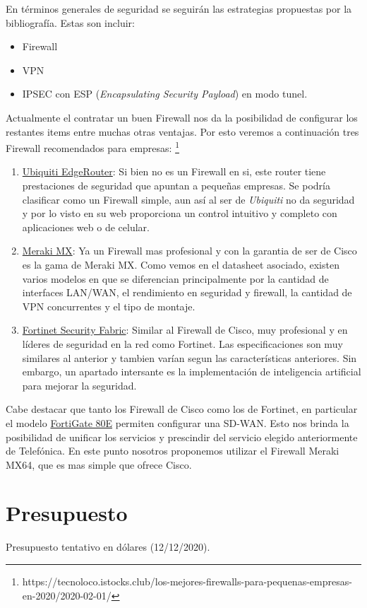 \documentclass[11pt]{article}
\begin{document}
    En términos generales de seguridad se seguirán las estrategias propuestas por la bibliografía. Estas son incluir:
    \begin{itemize}
        \item Firewall
        \item VPN
        \item IPSEC con ESP (\textit{Encapsulating Security Payload}) en modo tunel.
    \end{itemize}

    Actualmente el contratar un buen Firewall nos da la posibilidad de configurar los restantes items entre muchas otras ventajas. Por esto veremos a continuación tres Firewall
    recomendados para empresas: \footnote{https://tecnoloco.istocks.club/los-mejores-firewalls-para-pequenas-empresas-en-2020/2020-02-01/}

    \begin{enumerate}
        \item  \href{https://www.ui.com/edgemax/edgerouter/}{Ubiquiti EdgeRouter}: Si bien no es un Firewall en si, este router tiene prestaciones de seguridad que apuntan a pequeñas
        empresas. Se podría clasificar como un Firewall simple, aun así al ser de \textit{Ubiquiti} no da seguridad y por lo visto en su web proporciona 
        un control intuitivo y completo con aplicaciones web o de celular.
        \item \href{https://meraki.cisco.com/lib/pdf/meraki_datasheet_mx_es.pdf}{Meraki MX}: Ya un Firewall mas profesional y con la garantia de ser de Cisco es la gama de Meraki MX.
        Como vemos en el datasheet asociado, existen varios modelos en que se diferencian principalmente por la cantidad de interfaces LAN/WAN, el rendimiento en seguridad y firewall, la
        cantidad de VPN concurrentes y el tipo de montaje. 
        \item \href{https://www.fortinet.com/content/dam/fortinet/assets/white-papers/wp-security-fabric.pdf}{Fortinet Security Fabric}: Similar al Firewall de Cisco, muy profesional y
        en líderes de seguridad en la red como Fortinet. Las especificaciones son muy similares al anterior y tambien varían segun las características anteriores. Sin embargo, un apartado 
        intersante es la implementación de inteligencia artificial para mejorar la seguridad.
    \end{enumerate}

    Cabe destacar que tanto los Firewall de Cisco como los de Fortinet, en particular el modelo 
    \href{https://www.fortinet.com/content/dam/fortinet/assets/data-sheets/FortiGate_80E_Series.pdf}{FortiGate 80E} permiten configurar una SD-WAN. Esto nos brinda la 
    posibilidad de unificar los servicios y prescindir del servicio elegido anteriormente de Telefónica. En este punto nosotros proponemos utilizar el Firewall Meraki MX64, que es mas simple que ofrece Cisco.

    \section{Presupuesto}

    \begin{table}[H]
        \centering
        
        \caption{Presupuesto tentativo en dólares (12/12/2020).}
    \end{table}

    
\end{document}
